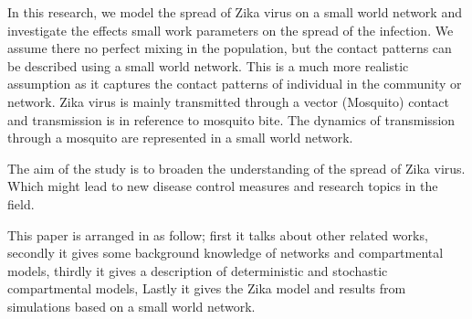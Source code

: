 In this research, we model the spread of Zika virus on a small world network and investigate the effects small work parameters on the spread of the infection. We assume there no perfect mixing in the population, but the contact patterns can be described using a small world network. This is a much more realistic assumption as it captures the contact patterns of individual in the community or network. Zika virus is mainly transmitted through a vector (Mosquito) contact and transmission is in reference to mosquito bite. The dynamics of transmission through a mosquito are represented in a small world network.

The aim of the study is to broaden the understanding of the spread of Zika virus. Which might lead to new disease control measures and research topics in the field.

This paper is arranged in as follow; first it talks about other related works, secondly it gives some background knowledge of networks and compartmental models, thirdly it gives a description of deterministic and stochastic compartmental models, Lastly it gives the Zika model and results from simulations based on a small world network.
